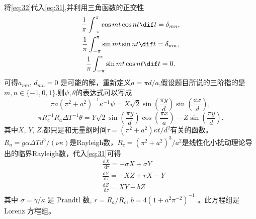 \documentclass[12pt]{ctexart}
\begin{document}
将\cref{eq:32}代入\cref{eq:31},并利用三角函数的正交性
\begin{gather}
	\frac{1}{\pi} \int^\pi_{-\pi} \cos mt \cos nt \dif t = \delta_{mn},\\
	\frac{1}{\pi} \int^\pi_{-\pi} \sin mt \sin nt \dif t = \delta_{mn},\\
	\frac{1}{\pi} \int^\pi_{-\pi} \sin mt \cos nt \dif t = 0.
\end{gather}
可得$a_{mn},\, d_{mn} = 0$ 是可能的解，重新定义$a=\pi d/a$,假设题目所说的三阶指的是$m,n \in \{-1,0,1\}$.则$\psi,\theta$的表达式可以写成\cite[P252]{shi}
\begin{equation}
	\pi a \left(\pi^2+a^2\right)^{-1} \kappa^{-1} \psi = X \sqrt{2} \sin \left(\frac{\pi y}{d}\right) \sin \left(\frac{a x}{d}\right),
	\label{eq:33}
\end{equation}
\begin{equation}
	\pi R_c^{-1}R_a \Delta T^{-1} \theta= Y \sqrt{2} \sin \left(\frac{\pi y}{d}\right) \cos \left(\frac{\pi x}{a}\right)- Z \sin \left(\frac{\pi y}{d}\right).
	\label{eq:34}
\end{equation}
其中$X,\, Y,\, Z.$都只是和无量纲时间$\tau = (\pi^2 + a^2)\kappa t / d^2$有关的函数。$R_a = g \alpha \Delta T d^3 / (\nu \kappa)$是Rayleigh数，$R_c = (\pi^2+a^2)^3/a^2$是线性化小扰动理论导出的临界Rayleigh数，代入\cref{eq:31}可得
\begin{equation}
	\begin{aligned}
		 & \frac{\mathrm{d} X}{\mathrm{~d} \tau}=-\sigma X+\sigma Y \\
		 & \frac{\mathrm{d} Y}{\mathrm{~d} \tau}=-X Z+r X-Y         \\
		 & \frac{\mathrm{d} Z}{\mathrm{~d} \tau}=X Y-b Z
	\end{aligned}
	\label{eq:3lorenz}
\end{equation}
其中 $\sigma=\gamma / \kappa$ 是 Prandtl 数, $r=R_{a} / R_{c},\, b=4\left(1+a^{2} \pi^{-2}\right)^{-1}$ 。此方程组是 Lorenz 方程组。
\end{document}
